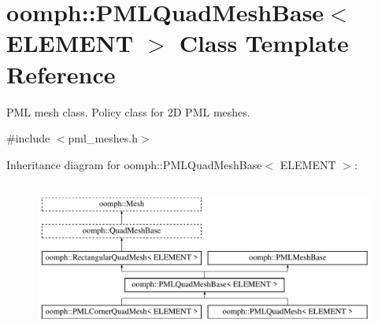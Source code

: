 \hypertarget{classoomph_1_1PMLQuadMeshBase}{}\section{oomph\+:\+:P\+M\+L\+Quad\+Mesh\+Base$<$ E\+L\+E\+M\+E\+NT $>$ Class Template Reference}
\label{classoomph_1_1PMLQuadMeshBase}


P\+ML mesh class. Policy class for 2D P\+ML meshes.  




{\ttfamily \#include $<$pml\+\_\+meshes.\+h$>$}

Inheritance diagram for oomph\+:\+:P\+M\+L\+Quad\+Mesh\+Base$<$ E\+L\+E\+M\+E\+NT $>$\+:\begin{figure}[H]
\begin{center}
\leavevmode
\includegraphics[height=5.000000cm]{classoomph_1_1PMLQuadMeshBase}
\end{center}
\end{figure}

